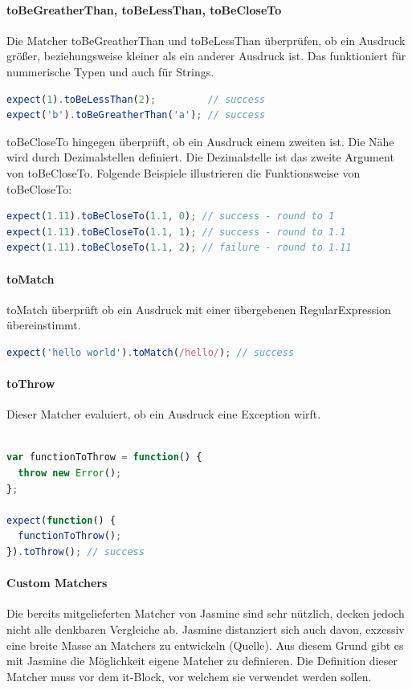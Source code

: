 \paragraph{toBeGreatherThan, toBeLessThan, toBeCloseTo}
Die Matcher toBeGreatherThan und toBeLessThan überprüfen, ob ein Ausdruck größer, beziehungsweise kleiner als ein anderer Ausdruck ist. Das funktioniert für nummerische Typen und auch für Strings.

\begin{lstlisting}[language=JavaScript]
expect(1).toBeLessThan(2);         // success
expect('b').toBeGreatherThan('a'); // success
\end{lstlisting}

toBeCloseTo hingegen überprüft, ob ein Ausdruck  einem zweiten ist. Die Nähe wird durch Dezimalstellen definiert. Die Dezimalstelle ist das zweite Argument von toBeCloseTo. Folgende Beispiele illustrieren die Funktionsweise von toBeCloseTo:

\begin{lstlisting}[language=JavaScript]
expect(1.11).toBeCloseTo(1.1, 0); // success - round to 1
expect(1.11).toBeCloseTo(1.1, 1); // success - round to 1.1
expect(1.11).toBeCloseTo(1.1, 2); // failure - round to 1.11
\end{lstlisting}

\paragraph{toMatch}
toMatch überprüft ob ein Ausdruck mit einer übergebenen RegularExpression übereinstimmt.

\begin{lstlisting}[language=JavaScript]
expect('hello world').toMatch(/hello/); // success
\end{lstlisting}

\paragraph{toThrow}
Dieser Matcher evaluiert, ob ein Ausdruck eine Exception wirft.

\begin{lstlisting}[language=JavaScript]

var functionToThrow = function() {
  throw new Error();
};

expect(function() {
  functionToThrow();
}).toThrow(); // success
\end{lstlisting}

\paragraph{Custom Matchers}
Die bereits mitgelieferten Matcher von Jasmine sind sehr nützlich, decken jedoch nicht alle denkbaren Vergleiche ab. Jasmine distanziert sich auch davon, exzessiv eine breite Masse an Matchers zu entwickeln (Quelle). Aus diesem Grund gibt es mit Jasmine die Möglichkeit eigene Matcher zu definieren. Die Definition dieser Matcher muss vor dem it-Block, vor welchem sie verwendet werden sollen.


